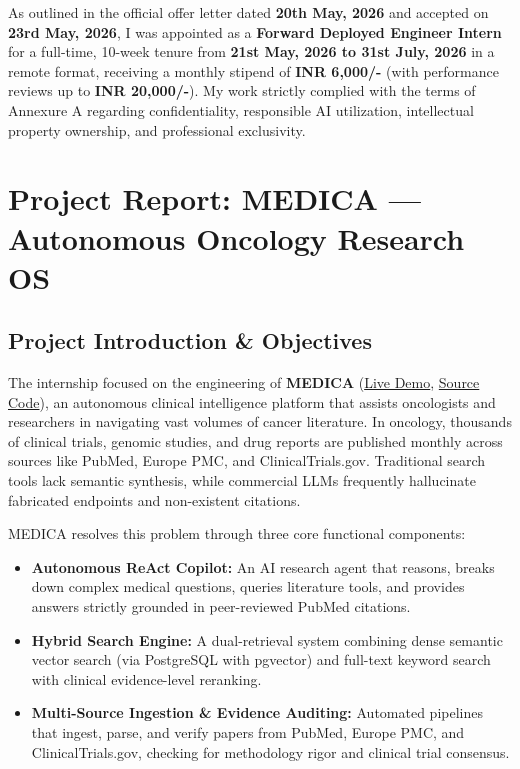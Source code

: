 \documentclass[11pt,a4paper]{article}
\begin{document}
As outlined in the official offer letter dated \textbf{20th May, 2026} and accepted on \textbf{23rd May, 2026}, I was appointed as a \textbf{Forward Deployed Engineer Intern} for a full-time, 10-week tenure from \textbf{21st May, 2026 to 31st July, 2026} in a remote format, receiving a monthly stipend of \textbf{INR 6,000/-} (with performance reviews up to \textbf{INR 20,000/-}). My work strictly complied with the terms of Annexure A regarding confidentiality, responsible AI utilization, intellectual property ownership, and professional exclusivity.

\section{Project Report: MEDICA --- Autonomous Oncology Research OS}

\subsection{Project Introduction \& Objectives}
The internship focused on the engineering of \textbf{MEDICA} (\href{https://medica-ictf.vercel.app}{Live Demo}, \href{https://github.com/SatyamPandey-07/MEDICA}{Source Code}), an autonomous clinical intelligence platform that assists oncologists and researchers in navigating vast volumes of cancer literature. In oncology, thousands of clinical trials, genomic studies, and drug reports are published monthly across sources like PubMed, Europe PMC, and ClinicalTrials.gov. Traditional search tools lack semantic synthesis, while commercial LLMs frequently hallucinate fabricated endpoints and non-existent citations.

MEDICA resolves this problem through three core functional components:
\begin{itemize}[leftmargin=*,noitemsep]
    \item \textbf{Autonomous ReAct Copilot:} An AI research agent that reasons, breaks down complex medical questions, queries literature tools, and provides answers strictly grounded in peer-reviewed PubMed citations.
    \item \textbf{Hybrid Search Engine:} A dual-retrieval system combining dense semantic vector search (via PostgreSQL with pgvector) and full-text keyword search with clinical evidence-level reranking.
    \item \textbf{Multi-Source Ingestion \& Evidence Auditing:} Automated pipelines that ingest, parse, and verify papers from PubMed, Europe PMC, and ClinicalTrials.gov, checking for methodology rigor and clinical trial consensus.
\end{itemize}
\end{document}
